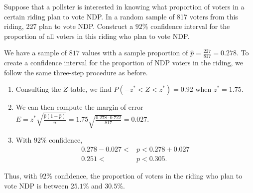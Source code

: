 \begin{example}Suppose that a pollster is interested in knowing what proportion of voters in a certain riding plan to vote NDP. In a random sample of 817 voters from this riding, 227 plan to vote NDP. Construct a $92\%$ confidence interval for the proportion of all voters in this riding who plan to vote NDP.

We have a sample of $817$ values with a sample proportion of $\widehat{p} = \frac{227}{817} = 0.278$. To create a confidence interval for the proportion of NDP voters in the riding, we follow the same three-step procedure as before.
\begin{center}
\end{center}
\begin{enumerate}[label=\textnormal{\Roman*}.]
\item Consulting the $Z$-table, we find $P(-z^* < Z < z^*) = 0.92$ when $z^* = 1.75$.
\item We can then compute the margin of error $E = z^* \sqrt{\frac{\widehat{p}(1-\widehat{p})}{n}} = 1.75 \sqrt{\frac{0.278 \cdot 0.722}{817}} = 0.027$.
\item With $92\%$ confidence,
$$\begin{aligned}0.278-0.027 < &p < 0.278+0.027  \\ 
0.251 < \ &p < 0.305.\end{aligned}$$
\end{enumerate}
Thus, with $92\%$ confidence, the proportion of voters in the riding who plan to vote NDP is between $25.1\%$ and $30.5\%$.
\end{example}

